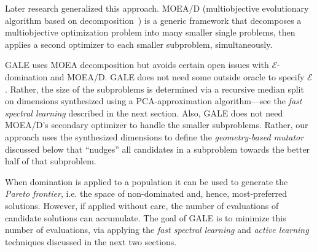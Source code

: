 \documentclass[10pt,journal,compsoc]{IEEEtran}
\newcommand{\tion}[1]{\textsection\ref{sec:#1}}
\begin{document}
Later research generalized this approach. MOEA/D (multiobjective
evolutionary algorithm based on decomposition~\cite{zhang07}) is a generic framework that decomposes a multiobjective optimization problem into many smaller single problems, then applies a second optimizer to each smaller subproblem, simultaneously. 

GALE uses MOEA decomposition but avoids certain open issues with   $\mathcal{E}$-domination and MOEA/D. 
GALE does not need some outside oracle to specify $\mathcal{E}$. 
Rather, the size of the subproblems is determined via a recursive median split on dimensions synthesized using a PCA-approximation algorithm---see the  {\em fast spectral learning} described in the next section. 
Also, GALE does not need MOEA/D's secondary optimizer to handle the smaller subproblems. 
Rather, our approach uses  the synthesized dimensions to define the {\em geometry-based mutator} discussed below that ``nudges'' all candidates in a subproblem towards the better half of that subproblem. 

 



When domination is applied to a population it can be used to generate the {\em Pareto frontier}, i.e.  the space of non-dominated and, hence, most-preferred solutions.  
However, if applied without care, the number of evaluations of candidate solutions can accumulate.  
The goal of GALE is to minimize this number of evaluations, via applying the {\em fast spectral learning} and {\em active learning} techniques discussed in the next two sections.





\end{document}
